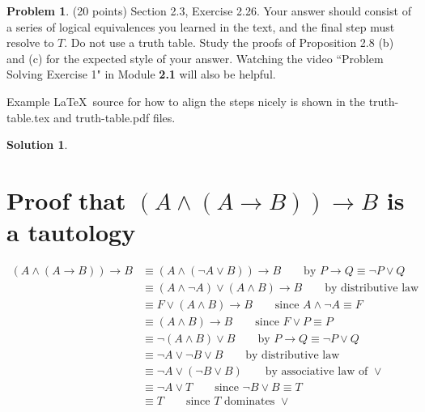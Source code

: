 \documentclass{article}
\theoremstyle{definition}
\newtheorem{problem}{Problem}
\newtheorem*{solution}{Solution}
\begin{document}
\newpage
\begin{problem} (20 points) Section 2.3, Exercise 2.26.
Your answer should consist of a series of logical equivalences 
you learned in the text, and the final step must resolve to $T$.
Do not use a truth table.  Study the proofs of Proposition 2.8 (b) and (c) 
for the expected style of your answer.  Watching the video ``Problem 
Solving Exercise 1" in Module \textbf{2.1} will also be helpful.

Example \LaTeX\ source for how to align the steps nicely is shown 
in the truth-table.tex and truth-table.pdf files.
\end{problem}
\begin{solution}
\hspace{1cm}
\section*{Proof that $(A \land (A \rightarrow B)) \rightarrow B$ is a tautology}
\begin{align}
(A \land (A \rightarrow B)) \rightarrow B &\equiv (A \land (\neg A \lor B)) \rightarrow B \quad \quad \mbox{by } P \rightarrow Q \equiv \neg P \lor Q\\
&\equiv (A \land \neg A) \lor (A \land B) \rightarrow B \quad \quad \mbox{by distributive law}\\
&\equiv F \lor (A \land B) \rightarrow B \quad \quad \mbox{since } A \land \neg A \equiv F\\
&\equiv (A \land B) \rightarrow B \quad \quad \mbox{since } F \lor P \equiv P\\
&\equiv \neg (A \land B) \lor B \quad \quad \mbox{by } P \rightarrow Q \equiv \neg P \lor Q\\
&\equiv \neg A \lor \neg B \lor B \quad \quad \mbox{by distributive law}\\
&\equiv \neg A \lor (\neg B \lor B) \quad \quad \mbox{by associative law of } \lor\\
&\equiv \neg A \lor T \quad \quad \mbox{since } \neg B \lor B \equiv T\\
&\equiv T \quad \quad \mbox{since } T \mbox{ dominates } \lor
\end{align}
\end{solution}
\end{document}
